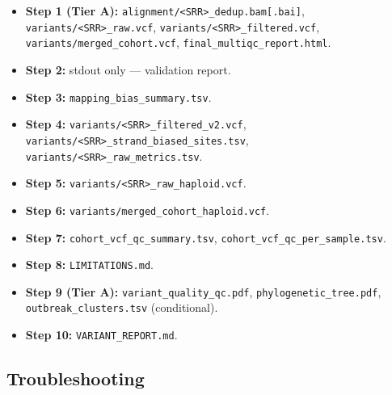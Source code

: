 \documentclass[
]{article}
\providecommand{\tightlist}{%
  \setlength{\itemsep}{0pt}\setlength{\parskip}{0pt}}
\begin{document}
\begin{itemize}
\tightlist
\item
  \textbf{Step 1 (Tier A):}
  \texttt{alignment/\textless{}SRR\textgreater{}\_dedup.bam{[}.bai{]}},
  \texttt{variants/\textless{}SRR\textgreater{}\_raw.vcf},
  \texttt{variants/\textless{}SRR\textgreater{}\_filtered.vcf},
  \texttt{variants/merged\_cohort.vcf},
  \texttt{final\_multiqc\_report.html}.
\item
  \textbf{Step 2:} stdout only --- validation report.
\item
  \textbf{Step 3:} \texttt{mapping\_bias\_summary.tsv}.
\item
  \textbf{Step 4:}
  \texttt{variants/\textless{}SRR\textgreater{}\_filtered\_v2.vcf},
  \texttt{variants/\textless{}SRR\textgreater{}\_strand\_biased\_sites.tsv},
  \texttt{variants/\textless{}SRR\textgreater{}\_raw\_metrics.tsv}.
\item
  \textbf{Step 5:}
  \texttt{variants/\textless{}SRR\textgreater{}\_raw\_haploid.vcf}.
\item
  \textbf{Step 6:} \texttt{variants/merged\_cohort\_haploid.vcf}.
\item
  \textbf{Step 7:} \texttt{cohort\_vcf\_qc\_summary.tsv},
  \texttt{cohort\_vcf\_qc\_per\_sample.tsv}.
\item
  \textbf{Step 8:} \texttt{LIMITATIONS.md}.
\item
  \textbf{Step 9 (Tier A):} \texttt{variant\_quality\_qc.pdf},
  \texttt{phylogenetic\_tree.pdf}, \texttt{outbreak\_clusters.tsv}
  (conditional).
\item
  \textbf{Step 10:} \texttt{VARIANT\_REPORT.md}.
\end{itemize}

\subsection{Troubleshooting}\label{troubleshooting}
\end{document}
